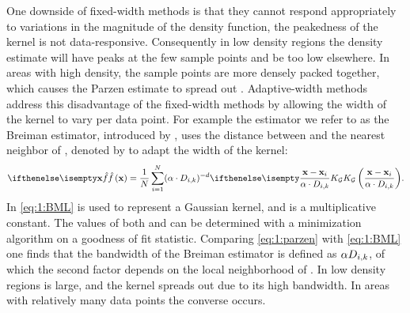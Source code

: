 	One downside of fixed-width methods is that they cannot respond appropriately to variations in the magnitude of the density function, \ie the peakedness of the kernel is not data-responsive. Consequently in low density regions the density estimate will have peaks at the few sample points and be too low elsewhere. In areas with high density, the sample points are more densely packed together, which causes the Parzen estimate to spread out \cite{breiman1977variable}. Adaptive-width methods address this disadvantage of the fixed-width methods by allowing the width of the kernel to vary per data point. For example the estimator we refer to as the Breiman estimator, introduced by \citeauthor{breiman1977variable}, uses the distance between \varPattern[\itXis] and the \KNNK nearest neighbor of \varPattern[\itXis], denoted by \varKNNDistance{\itXis}{\KNNK} to adapt the width of the kernel:
	\begin{equation}\label{eq:1:BML}
	 	\varEstimatedDensityFunction{\varPattern} = \frac{1}{\varNumPatterns} \sum_{\itXis = 1}^{\varNumPatterns} (\varBMLconstant \cdot \varKNNDistance{\itXis}{k})^{-\varDim} \varKernel[\varGaussian]{\frac{\varPattern - \varPattern[\itXis]}{\varBMLconstant \cdot \varKNNDistance{\itXis}{k}}}.
	\end{equation} 
	In \cref{eq:1:BML} \varKernel[\varGaussian]{} is used to represent a Gaussian kernel, and \varBMLconstant is a multiplicative constant. The values of both \varBMLconstant and \KNNK can be determined with a minimization algorithm on a goodness of fit statistic. Comparing \cref{eq:1:parzen} with \eqref{eq:1:BML} one finds that the bandwidth \varBandwidth of the Breiman estimator is defined as $\alpha D_{i, k}$, of which the second factor depends on the local neighborhood of \varPattern[\itXis]. In low density regions \varKNNDistance{\itXis}{\KNNK} is large, and the kernel spreads out due to its high bandwidth. In areas with relatively many data points the converse occurs.

